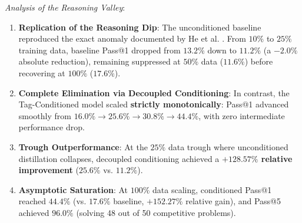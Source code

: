 \documentclass{ieeeaccess}
\begin{document}
\begin{table}[!t]
\caption{Pass@k Performance Comparison Across Data Scaling Fractions (50 Test Problems, 250 Executions/Run)}
\label{tab:valley_pass_rates}
\centering
{}
\end{table}

\textit{Analysis of the Reasoning Valley}:
\begin{enumerate}
    \item \textbf{Replication of the Reasoning Dip}: The unconditioned baseline reproduced the exact anomaly documented by He et al. \cite{he2025valley}. From $10\%$ to $25\%$ training data, baseline Pass@1 dropped from $13.2\%$ down to $11.2\%$ (a $-2.0\%$ absolute reduction), remaining suppressed at $50\%$ data ($11.6\%$) before recovering at $100\%$ ($17.6\%$).
    \item \textbf{Complete Elimination via Decoupled Conditioning}: In contrast, the Tag-Conditioned model scaled \textbf{strictly monotonically}: Pass@1 advanced smoothly from $16.0\% \to 25.6\% \to 30.8\% \to 44.4\%$, with zero intermediate performance drop.
    \item \textbf{Trough Outperformance}: At the $25\%$ data trough where unconditioned distillation collapses, decoupled conditioning achieved a \textbf{$+128.57\%$ relative improvement} ($25.6\%$ vs. $11.2\%$).
    \item \textbf{Asymptotic Saturation}: At $100\%$ data scaling, conditioned Pass@1 reached $44.4\%$ (vs. $17.6\%$ baseline, $+152.27\%$ relative gain), and Pass@5 achieved \textbf{$96.0\%$} (solving 48 out of 50 competitive problems).
\end{enumerate}
\end{document}
